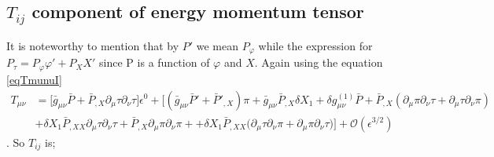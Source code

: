 \documentclass[a4paper,11pt]{article}
\begin{document}
\subsection{$T_{ij}$ component of energy momentum tensor}
It is noteworthy to mention that by $P'$ we mean $P_{\varphi}$ while the expression for $P_{\tau}= P_{\varphi} \varphi' + P_{X} X'$ since P is a function of $\varphi$ and $X$.
Again using the equation \ref{eqTmunuI}
\begin{align}
T_{\mu \nu} &
= \Big[ \bar{g}_{\mu \nu} \bar{P} 
+
 \bar{P}_{,X} \partial_{\mu} \tau \partial_{\nu} \tau \Big] \epsilon ^0 
+
\Big[ ({\bar{g}_{\mu \nu}} \bar{P}' +\bar{P}'_{, X})\pi+ \bar{g}_{\mu \nu}  \bar{P}_{,X} \delta X_1 
+
 \delta g^{(1)}_{\mu \nu} \bar{P} 
 +
  \bar{P}_{,X}  \left ( \partial_{\mu} \pi \partial_{\nu} \tau 
  +
  \partial_{\mu} \tau \partial_{\nu} \pi  \right ) 
       \nonumber \\ &
  +
   \delta X_1 \bar{P}_{,XX}   \partial_{\mu} \tau \partial_{\nu} \tau  
   +
    \bar{P}_{,X}   \partial_{\mu} \pi \partial_{\nu} \pi  + 
    +  \delta X_1 \bar{P}_{,XX}  \big(  \partial_{\mu} \tau \partial_{\nu} \pi  +   \partial_{\mu} \pi \partial_{\nu} \tau \big ) \Big]
+ \mathcal {O}(\epsilon^{3/2}) 
\end{align}.
So $T_{ij}$ is;
\end{document}
